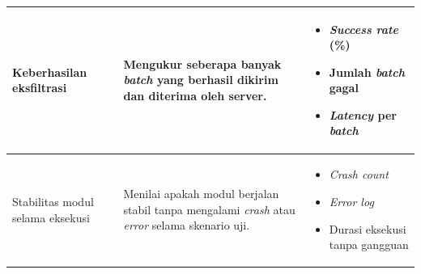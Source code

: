 \begin{longtable}{|p{3.2cm}|p{4.5cm}|p{4.6cm}|}
Keberhasilan eksfiltrasi
&
Mengukur seberapa banyak \textit{batch} yang berhasil dikirim dan diterima oleh server.
&
\begin{itemize}[leftmargin=*]
  \item \textit{Success rate} (\%)
  \item Jumlah \textit{batch} gagal
  \item \textit{Latency} per \textit{batch}
\end{itemize}
\\
\hline

Stabilitas modul selama eksekusi
&
Menilai apakah modul berjalan stabil tanpa mengalami \textit{crash} atau \textit{error} selama skenario uji.
&
\begin{itemize}[leftmargin=*]
  \item \textit{Crash count}
  \item \textit{Error log}
  \item Durasi eksekusi tanpa gangguan
\end{itemize}
\\
\hline

\end{longtable}